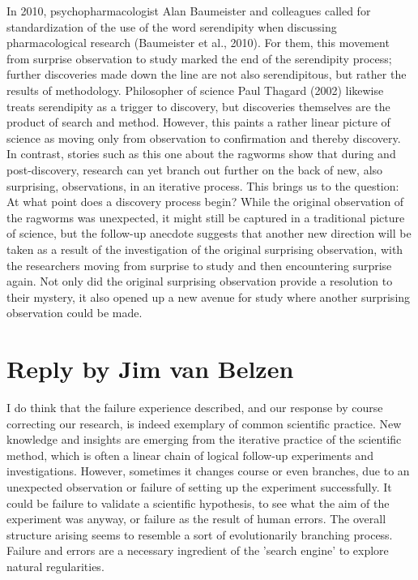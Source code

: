 \documentclass[authordate, empirical]{jote-new-article}
\begin{document}
	In 2010, psychopharmacologist Alan Baumeister and colleagues called for standardization of the use of the word serendipity when discussing pharmacological research (Baumeister et al., 2010). For them, this movement from surprise observation to study marked the end of the serendipity process; further discoveries made down the line are not also serendipitous, but rather the results of methodology. Philosopher of science Paul Thagard (2002) likewise treats serendipity as a trigger to discovery, but discoveries themselves are the product of search and method. However, this paints a rather linear picture of science as moving only from observation to confirmation and thereby discovery. In contrast, stories such as this one about the ragworms show that during and post-discovery, research can yet branch out further on the back of new, also surprising, observations, in an iterative process. This brings us to the question: At what point does a discovery process begin? While the original observation of the ragworms was unexpected, it might still be captured in a traditional picture of science, but the follow-up anecdote suggests that another new direction will be taken as a result of the investigation of the original surprising observation, with the researchers moving from surprise to study and then encountering surprise again. Not only did the original surprising observation provide a resolution to their mystery, it also opened up a new avenue for study where another surprising observation could be made.

\newpage

	\section{Reply by Jim van Belzen}



	I do think that the failure experience described, and our response by course correcting our research, is indeed exemplary of common scientific practice. New knowledge and insights are emerging from the iterative practice of the scientific method, which is often a linear chain of logical follow-up experiments and investigations. However, sometimes it changes course or even branches, due to an unexpected observation or failure of setting up the experiment successfully. It could be failure to validate a scientific hypothesis, to see what the aim of the experiment was anyway, or failure as the result of human errors. The overall structure arising seems to resemble a sort of evolutionarily branching process. Failure and errors are a necessary ingredient of the 'search engine' to explore natural regularities.
\end{document}
